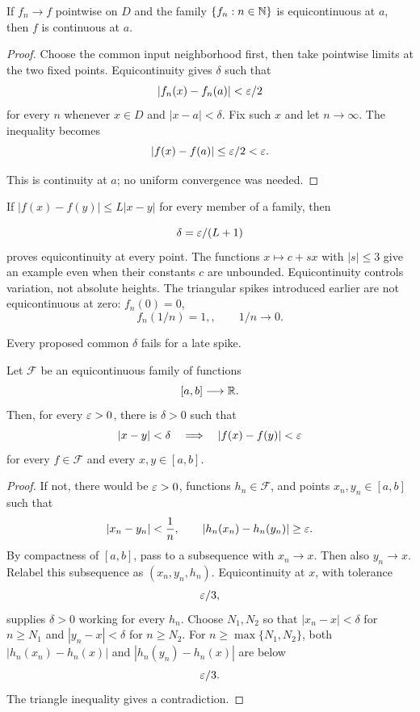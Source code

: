 \begin{proposition}
If $f_n\to f$ pointwise on $D$ and the family $\left\{f_n:n\in\mathbb{N}\right\}$ is equicontinuous at $a$, then $f$ is continuous at $a$.
\end{proposition}
\begin{proof}
Choose the common input neighborhood first, then take
pointwise limits at the two fixed points. Equicontinuity gives $\delta$
such that
\[
|f_n(x)-f_n(a)|<\varepsilon/2
\]
 for every $n$ whenever
$x\in D$ and $|x-a|<\delta$. Fix such $x$ and let $n\to\infty$.
The inequality becomes
\[
|f(x)-f(a)|\leq\varepsilon/2<\varepsilon.
\]

This is continuity at $a$; no uniform convergence was needed.
\end{proof}

\begin{example}
If $|f(x)-f(y)|\leq L|x-y|$ for every member of a family, then

\[
\delta=\varepsilon/(L+1)
\]
 proves equicontinuity at every point.
The functions $x\mapsto c+sx$ with $|s|\leq3$ give an example even
when their constants $c$ are unbounded. Equicontinuity controls variation,
not absolute heights. The triangular spikes introduced earlier are not
equicontinuous at zero: $f_n(0)=0$,
\[
f_n(1/n)=1,,\qquad 1/n\to0.
\]

Every proposed common $\delta$ fails for a late spike.
\end{example}
\begin{lemma}
\label{lem:uniform-equicontinuity-interval}
Let $\mathcal F$ be an equicontinuous family of functions
\[
[a,b]\longrightarrow\mathbb{R}.
\]
Then, for every $\varepsilon>0$, there is $\delta>0$ such that
\[
\lvert x-y\rvert<\delta
\quad\Longrightarrow\quad
\lvert f(x)-f(y)\rvert<\varepsilon
\]
for every $f\in\mathcal F$ and every $x,y\in[a,b]$.
\end{lemma}
\begin{proof}
If not, there would be $\varepsilon>0$, functions $h_n\in\mathcal F$, and points
$x_n,y_n\in[a,b]$ such that
\[
\lvert x_n-y_n\rvert<\frac1n,
\qquad
\lvert h_n(x_n)-h_n(y_n)\rvert\geq\varepsilon.
\]
By compactness of $[a,b]$, pass to a subsequence with $x_n\to x$.  Then also
$y_n\to x$.  Relabel this subsequence as $(x_n,y_n,h_n)$.  Equicontinuity at
$x$, with tolerance
\[
\varepsilon/3,
\]
 supplies $\delta>0$ working for every $h_n$.
Choose $N_1,N_2$ so that $|x_n-x|<\delta$ for $n\geq N_1$ and
$|y_n-x|<\delta$ for $n\geq N_2$. For $n\geq\max\{N_1,N_2\}$,
both $|h_n(x_n)-h_n(x)|$ and $|h_n(y_n)-h_n(x)|$ are below
\[
\varepsilon/3.
\]
  The triangle inequality gives a contradiction.
\end{proof}

